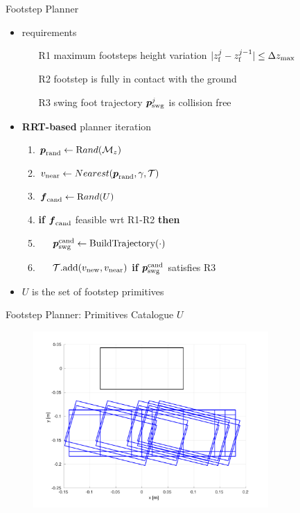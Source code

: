 \documentclass[10pt]{beamer}
\begin{document}
\begin{frame}{Footstep Planner}
  \begin{itemize}
    \item requirements
      \begin{itemize}[<alert@+>]
        \item[R1] maximum footsteps height variation
				    $|z_{\rm f}^j - z_{\rm f}^{j-1}| \le \Delta z_{\max}$
        \item[R2] footstep is fully in contact with the ground
        \item[R3] swing foot trajectory ${\mbox{\boldmath $p$}}_{\rm {swg}}^j$ is collision free
			\end{itemize}
    \item \textbf{RRT-based} planner iteration
      \begin{enumerate}[<alert@+>]
        \item ${\mbox{\boldmath $p$}}_{\rm rand} \leftarrow {\text Rand}(\mathcal{M}_z)$
				\item $v_{\rm near} \leftarrow Nearest({\mbox{\boldmath $p$}}_{\rm rand}, \gamma,
            \mathcal{T})$
        \item ${\mbox{\boldmath $f$}}_{\rm cand} \leftarrow {\text Rand}(U)$
				\item \textbf{if} ${\mbox{\boldmath $f$}}_{\rm cand}$ feasible wrt R1-R2 \textbf{then}
				\item $\quad$ ${\mbox{\boldmath $p$}}_{\rm swg}^{\rm cand}
						\leftarrow \text{BuildTrajectory}(\cdot)$
				\item $\quad$ $\mathcal{T}\text{.add}(v_{\rm new}, v_{\rm near})$
						\textbf{if} ${\mbox{\boldmath $p$}}_{\rm swg}^{\rm cand}$ satisfies R3
      \end{enumerate}
    \item $U$ is the set of footstep primitives
	\end{itemize}
\end{frame}

\begin{frame}{Footstep Planner: Primitives Catalogue $U$}
	\begin{figure}
		\centering
		\includegraphics[width=0.8\textwidth]{figures/catalogue-primitives.pdf}
	\end{figure}
\end{frame}
\end{document}
